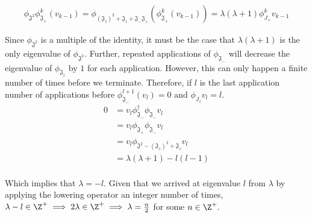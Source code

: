 \begin{equation}
	\begin{aligned}
		\phi_{\mathfrak{J^2}}\phi_{\mathfrak{J}_+}^k(v_{k-1}) = \phi_{(\mathfrak{J}_z)^2 +\mathfrak{J}_z+ \mathfrak{J}_-\mathfrak{J}_+}(\phi_{\mathfrak{J}_+}^k(v_{k-1})) = \lambda(\lambda + 1) \phi_{J_+}^kv_{k-1}
	\end{aligned}
\end{equation} 

Since $\phi_{\mathfrak{J^2}}$ is a multiple of the identity, it must be the case that $\lambda(\lambda +1)$ is the only eigenvalue of $\phi_{\mathfrak{J^2}}$. Further, repeated applications of $\phi_{\mathfrak{J}_-}$ will decrease the eigenvalue of $\phi_{\mathfrak{J}_z}$ by $1$ for each application. However, this can only happen a finite number of times before we terminate. Therefore, if $l$ is the last application number of applications before  $\phi_{\mathfrak{J}_-}^{l+1}(v_{l}) = 0$ and $\phi_{J_z}v_l = l$.
\begin{equation}
	\begin{aligned}
		0 &= v_{l}  \phi_{\mathfrak{J}_-}^\dag \phi_{\mathfrak{J}_-} v_{l} \\
		&= v_{l} \phi_{\mathfrak{J}_+}\phi_{\mathfrak{J}_-}v_{l} \\
			&= v_{l}\phi_{\mathfrak{J^2} - (\mathfrak{J}_z)^2 + \mathfrak{J}_z}v_{l} \\
		&= \lambda(\lambda+ 1) - l(l - 1)\\
	\end{aligned}
\end{equation} 

Which implies that $\lambda = -l$. Given that we arrived at eigenvalue $l$ from $\lambda$ by applying the lowering operator an integer number of times, $\lambda - l \in \Z^+ \implies 2\lambda\in\Z^+ \implies \lambda = \frac{n}{2}$ for some $n\in\Z^+.$


